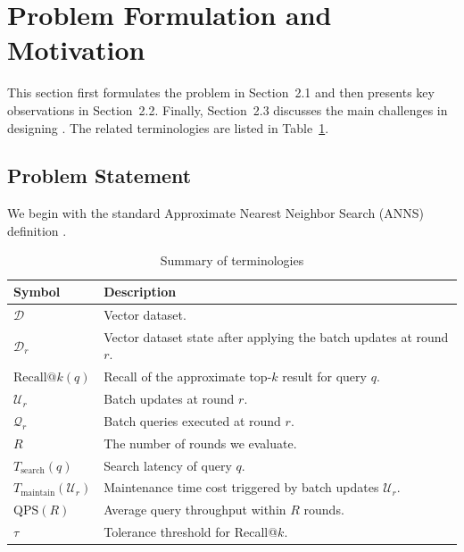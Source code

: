 \section{Problem Formulation and Motivation}
This section first formulates the problem in Section~2.1 and then presents key observations in Section~2.2. Finally, Section~2.3 discusses the main challenges in designing \system. The related terminologies are listed in Table~\ref{tab:symbols}.

\subsection{Problem Statement}

We begin with the standard Approximate Nearest Neighbor Search (ANNS) definition \cite{Song2025}.

\begin{table}[t]
  \caption{Summary of terminologies}
  \label{tab:symbols}
  \begin{tabular}{lp{6.3cm}}
    \toprule
    Symbol & Description\\
    \midrule
    $\mathcal{D}$ & Vector dataset. \\
    $\mathcal{D}_r$ & Vector dataset state after applying the batch updates at round $r$. \\
    $\mathrm{Recall@}k(q)$ & Recall of the approximate top-$k$ result for query $q$. \\
    $\mathcal{U}_r$ & Batch updates at round $r$. \\
    $\mathcal{Q}_r$ & Batch queries executed at round $r$. \\
	$R$ & The number of rounds we evaluate. \\
    $T_{\mathrm{search}}(q)$ & Search latency of query $q$. \\
    $T_{\mathrm{maintain}}(\mathcal{U}_r)$ & Maintenance time cost triggered by batch updates $\mathcal{U}_r$. \\
    $\mathrm{QPS}(R)$ & Average query throughput within $R$ rounds. \\
    $\tau$ & Tolerance threshold for Recall@$k$. \\
    \bottomrule
  \end{tabular}
\end{table}

